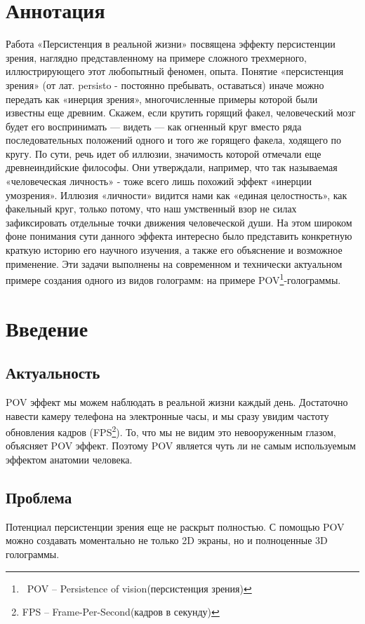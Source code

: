 \documentclass[a4paper, 12pt]{article}
\begin{document}
\section{Аннотация}
Работа «Персистенция в реальной жизни» посвящена эффекту 
персистенции зрения, наглядно представленному на примере сложного 
трехмерного, иллюстрирующего этот любопытный феномен, опыта. 
Понятие «персистенция зрения» (от лат. persisto - постоянно 
пребывать, оставаться) иначе можно передать как «инерция зрения», 
многочисленные примеры которой были известны еще древним. Скажем, 
если крутить горящий факел, человеческий мозг будет его 
воспринимать — видеть — как огненный круг вместо ряда 
последовательных положений одного и того же горящего факела, 
ходящего по кругу. По сути, речь идет об иллюзии, значимость 
которой отмечали еще древнеиндийские философы. Они утверждали, 
например, что так называемая «человеческая личность»    - тоже 
всего лишь похожий эффект «инерции умозрения». Иллюзия «личности» 
видится нами как «единая целостность», как факельный круг, только 
потому, что наш умственный взор не силах зафиксировать отдельные 
точки движения человеческой души. На этом широком фоне понимания 
сути данного эффекта интересно было представить конкретную краткую 
историю его научного изучения, а также его объяснение и возможное 
применение. Эти задачи выполнены на современном и технически 
актуальном примере создания одного из видов голограмм: на примере 
POV\footnote{\ POV -- Persistence of vision(персистенция 
зрения)}-голограммы.
\newpage
\section{Введение}
\subsection{Актуальность}
POV эффект мы можем наблюдать в реальной жизни каждый день.
Достаточно навести камеру телефона на электронные часы,
и мы сразу увидим частоту обновления кадров (FPS\footnote{FPS -- Frame-Per-Second(кадров в секунду)}).
То, что мы не видим это невооруженным глазом, объясняет POV эффект.
Поэтому POV является чуть ли не самым используемым эффектом анатомии человека.
\subsection{Проблема}
Потенциал персистенции зрения еще не раскрыт полностью. С помощью POV можно
создавать моментально не только 2D экраны, но и полноценные 3D голограммы.
\end{document}
